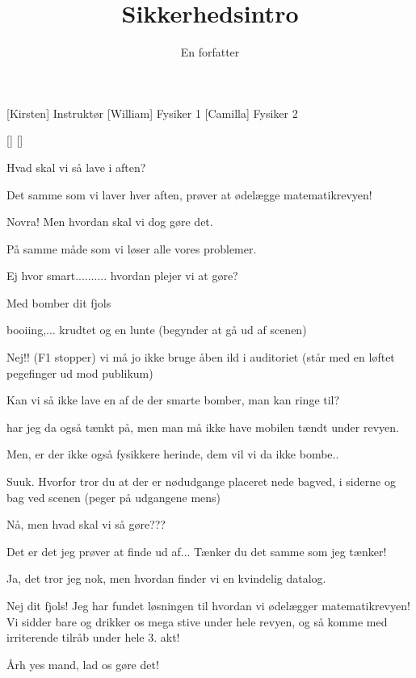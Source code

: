\documentclass[a4paper,11pt]{article}
\title{Sikkerhedsintro}
\author{En forfatter}
\begin{document}
\maketitle

\begin{roles}
[Kirsten] Instruktør
[William] Fysiker 1
[Camilla] Fysiker 2
\end{roles}

\begin{props}
[]
[]
\end{props}

\begin{sketch}

 Hvad skal vi så lave i aften?

 Det samme som vi laver hver aften, prøver at ødelægge matematikrevyen!

 Novra! Men hvordan skal vi dog gøre det.

 På samme måde som vi løser alle vores problemer.

 Ej hvor smart.......... hvordan plejer vi at gøre?

 Med bomber dit fjols

 booiing,... krudtet og en lunte (begynder at gå ud af scenen)

 Nej!! (F1 stopper) vi må jo ikke bruge åben ild i auditoriet (står med en løftet pegefinger ud mod publikum)

 Kan vi så ikke lave en af de der smarte bomber, man kan ringe til?

 har jeg da også tænkt på, men man må ikke have mobilen tændt under revyen.

 Men, er der ikke også fysikkere herinde, dem vil vi da ikke bombe..

 Suuk. Hvorfor tror du at der er nødudgange placeret nede bagved, i siderne og bag ved scenen (peger på udgangene mens)

 Nå, men hvad skal vi så gøre???

 Det er det jeg prøver at finde ud af... Tænker du det samme som jeg tænker!

 Ja, det tror jeg nok, men hvordan finder vi en kvindelig datalog.

 Nej dit fjols! Jeg har fundet løsningen til hvordan vi ødelægger matematikrevyen! Vi sidder bare og drikker os mega stive under hele revyen, og så komme med irriterende tilråb under hele 3. akt!

 Årh yes mand, lad os gøre det!
\end{sketch}
\end{document}
